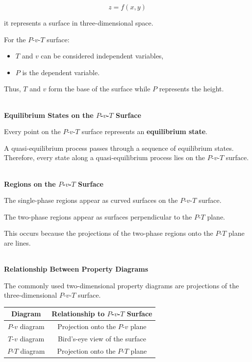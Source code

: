 \documentclass[12pt]{article}
\begin{document}
\begin{equation*}
z=f(x,y)
\end{equation*}

it represents a surface in three-dimensional space.

For the $P$-$v$-$T$ surface:
\begin{itemize}
    \item $T$ and $v$ can be considered independent variables,
    \item $P$ is the dependent variable.
\end{itemize}

Thus, $T$ and $v$ form the base of the surface while $P$ represents the height.

\textbf{\\ Equilibrium States on the $P$-$v$-$T$ Surface}

Every point on the $P$-$v$-$T$ surface represents an \textbf{equilibrium state}.

A quasi-equilibrium process passes through a sequence of equilibrium states. Therefore, every state along a quasi-equilibrium process lies on the $P$-$v$-$T$ surface.

\textbf{\\ Regions on the $P$-$v$-$T$ Surface}

The single-phase regions appear as curved surfaces on the $P$-$v$-$T$ surface.

The two-phase regions appear as surfaces perpendicular to the $P$-$T$ plane.

This occurs because the projections of the two-phase regions onto the $P$-$T$ plane are lines.

\textbf{\\ Relationship Between Property Diagrams}

The commonly used two-dimensional property diagrams are projections of the three-dimensional $P$-$v$-$T$ surface.

\begin{center}
    \begin{tabular}{|c|c|}
        \hline
        \textbf{Diagram} & \textbf{Relationship to $P$-$v$-$T$ Surface} \\
        \hline
        $P$-$v$ diagram & Projection onto the $P$-$v$ plane \\
        \hline
        $T$-$v$ diagram & Bird's-eye view of the surface \\
        \hline
        $P$-$T$ diagram & Projection onto the $P$-$T$ plane \\
        \hline
    \end{tabular}
\end{center}
\end{document}
